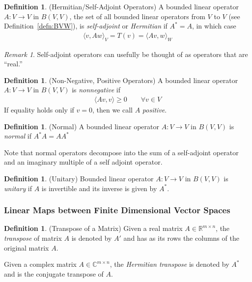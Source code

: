 \documentclass[12pt]{book}
\numberwithin{equation}{section} %
\theoremstyle{plain}
\theoremstyle{definition}
\newtheorem{defn}[thm]{Definition}
\theoremstyle{remark}
\newtheorem*{rmk}{Remark}
\newcommand{\ra}{\rightarrow}
\newcommand{\Rmn}{\mathbb{R}^{m\times n}}
\newcommand{\Cmn}{\mathbb{C}^{m\times n}}
\begin{document}
\begin{defn}(Hermitian/Self-Adjoint Operators)
A bounded linear operator $A:V\ra V$ in $B(V,V)$, the set of all bounded
linear operators from $V$ to $V$ (see Definition~\ref{defn:BVW}), is
\emph{self-adjoint} or \emph{Hermitian} if $A^*=A$, in which case
\begin{align*}
  \langle v,Aw \rangle_V
  =
  T(v)
  =
  \langle Av,w\rangle_W
\end{align*}
\end{defn}
\begin{rmk}
Self-adjoint operators can usefully be thought of as operators that are
``real.''
\end{rmk}

\begin{defn}(Non-Negative, Positive Operators)
A bounded linear operator $A:V\ra V$ in $B(V,V)$
is \emph{nonnegative} if
\begin{align*}
  \langle Av, v\rangle \geq 0
  \qquad\forall v\in V
\end{align*}
If equality holds only if $v=0$, then we call $A$ \emph{positive}.
\end{defn}

\begin{defn}(Normal)
A bounded linear operator $A:V\ra V$ in $B(V,V)$
is \emph{normal} if $A^*A=AA^*$

Note that normal operators decompose into the sum of a self-adjoint
operator and an imaginary multiple of a self adjoint operator.
\end{defn}

\begin{defn}(Unitary)
Bounded linear operator $A:V\ra V$ in $B(V,V)$ is \emph{unitary} if $A$
is invertible and its inverse is given by $A^*$.
\end{defn}


\clearpage
\subsubsection{Linear Maps between Finite Dimensional Vector Spaces}

\begin{defn}(Transpose of a Matrix)
Given a real matrix $A\in\Rmn$, the \emph{transpose} of matrix $A$ is
denoted by $A'$ and has as its rows the columns of the original matrix
$A$.

Given a complex matrix $A\in\Cmn$, the \emph{Hermitian transpose} is
denoted by $A^*$ and is the conjugate transpose of $A$.
\end{defn}
\end{document}
